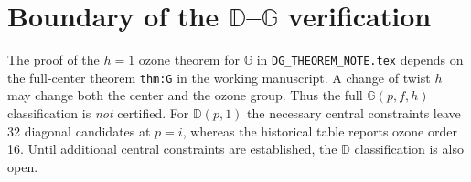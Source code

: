 \section{Boundary of the $\mathbb D$--$\mathbb G$ verification}
The proof of the $h=1$ ozone theorem for $\mathbb G$ in
\texttt{DG\_THEOREM\_NOTE.tex} depends on the full-center theorem
\texttt{thm:G} in the working manuscript. A change of twist $h$ may change
both the center and the ozone group. Thus the full $\mathbb G(p,f,h)$
classification is \emph{not} certified. For $\mathbb D(p,1)$ the necessary
central constraints leave 32 diagonal candidates at $p=i$, whereas the
historical table reports ozone order 16. Until additional central
constraints are established, the $\mathbb D$ classification is also open.

